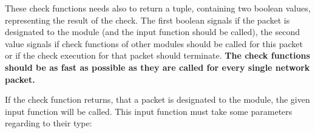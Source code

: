 \documentclass[a4paper, 11pt]{article}
\begin{document}
                These check functions needs also to return a tuple, containing two boolean values, representing the result of the check. The first boolean signals if the packet is designated to the module (and the input function should be called), the second value signals if check functions of other modules should be called for this packet or if the check execution for that packet should terminate.
                \textbf{The check functions should be as fast as possible as they are called for every single network packet.}
                
                If the check function returns, that a packet is designated to the module, the given input function will be called. This input function must take some parameters regarding to their type:
                \\
                
\end{document}
